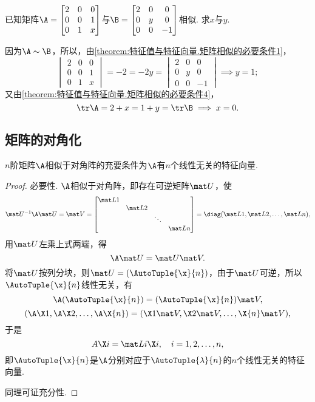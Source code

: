 \begin{example}
已知矩阵\(\A = \begin{bmatrix}
	2 & 0 & 0 \\
	0 & 0 & 1 \\
	0 & 1 & x
\end{bmatrix}\)与\(\B = \begin{bmatrix}
	2 & 0 & 0 \\
	0 & y & 0 \\
	0 & 0 & -1
\end{bmatrix}\)相似.
求\(x\)与\(y\).
\begin{solution}
因为\(\A\sim\B\)，所以，由\cref{theorem:特征值与特征向量.矩阵相似的必要条件1}，
\[
\begin{vmatrix}
	2 & 0 & 0 \\
	0 & 0 & 1 \\
	0 & 1 & x
\end{vmatrix}
= -2 = -2y =
\begin{vmatrix}
	2 & 0 & 0 \\
	0 & y & 0 \\
	0 & 0 & -1
\end{vmatrix}
\implies y = 1;
\]
又由\cref{theorem:特征值与特征向量.矩阵相似的必要条件4}，
\[
\tr\A = 2+x
= 1+y = \tr\B
\implies
x = 0.
\]
\end{solution}
\end{example}

\subsection{矩阵的对角化}
\begin{theorem}[矩阵可对角化的充要条件]
\(n\)阶矩阵\(\A\)相似于对角阵的充要条件为\(\A\)有\(n\)个线性无关的特征向量.
\begin{proof}
必要性.
\(\A\)相似于对角阵，即存在可逆矩阵\(\P\)，使\[
\P^{-1}\A\P=\V=\begin{bmatrix}
\L{1} \\ & \L{2} \\ & & \ddots \\ & & &\L{n}
\end{bmatrix}=\diag(\L{1},\L{2},\dotsc,\L{n}),
\]用\(\P\)左乘上式两端，得\[
\A\P=\P\V.
\]将\(\P\)按列分块，则\(\P=(\AutoTuple{\x}{n})\)，由于\(\P\)可逆，所以\(\AutoTuple{\x}{n}\)线性无关，有\[
\A(\AutoTuple{\x}{n})=(\AutoTuple{\x}{n})\V,
\]\[
(\A\X1,\A\X2,\dotsc,\A\X{n})=(\X1\V,\X2\V,\dotsc,\X{n}\V),
\]于是\[
A\X i=\L{i}\X i,
\quad i=1,2,\dotsc,n,
\]即\(\AutoTuple{\x}{n}\)是\(\A\)分别对应于\(\AutoTuple{\lambda}{n}\)的\(n\)个线性无关的特征向量.

同理可证充分性.
\end{proof}
\end{theorem}

